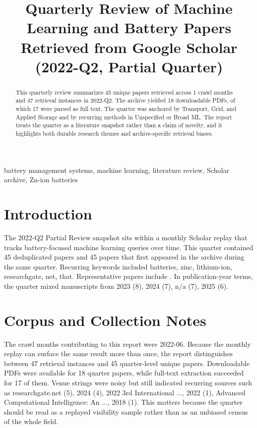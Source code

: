 \documentclass[conference]{IEEEtran}
\begin{document}
\title{ Quarterly Review of Machine Learning and Battery Papers Retrieved from Google Scholar (2022-Q2, Partial Quarter) }

\author{
}

\maketitle

\begin{abstract}
This quarterly review summarizes 45 unique papers retrieved across 1 crawl months and 47 retrieval instances in 2022-Q2. The archive yielded 18 downloadable PDFs, of which 17 were parsed as full text. The quarter was anchored by Transport, Grid, and Applied Storage and by recurring methods in Unspecified or Broad ML. The report treats the quarter as a literature snapshot rather than a claim of novelty, and it highlights both durable research themes and archive-specific retrieval biases.
\end{abstract}

\begin{IEEEkeywords}
battery management systems, machine learning, literature review, Scholar archive, Zn-ion batteries
\end{IEEEkeywords}

\section{Introduction}
The 2022-Q2 Partial Review snapshot sits within a monthly Scholar replay that tracks battery-focused machine learning queries over time. This quarter contained 45 deduplicated papers and 45 papers that first appeared in the archive during the same quarter. Recurring keywords included batteries, zinc, lithium-ion, researchgate, net, that. Representative papers include \cite{machinelearningdriven2025,socestimationof2023,recentadvancesin2025,aphysicsinspired2023}. In publication-year terms, the quarter mixed manuscripts from 2023 (8), 2024 (7), n/a (7), 2025 (6).

\section{Corpus and Collection Notes}
The crawl months contributing to this report were 2022-06. Because the monthly replay can surface the same result more than once, the report distinguishes between 47 retrieval instances and 45 quarter-level unique papers. Downloadable PDFs were available for 18 quarter papers, while full-text extraction succeeded for 17 of them. Venue strings were noisy but still indicated recurring sources such as researchgate.net (5), 2024 (4), 2022 3rd International ..., 2022 (1), Advanced Computational Intelligence: An ..., 2018 (1). This matters because the quarter should be read as a replayed visibility sample rather than as an unbiased census of the whole field.
\end{document}
